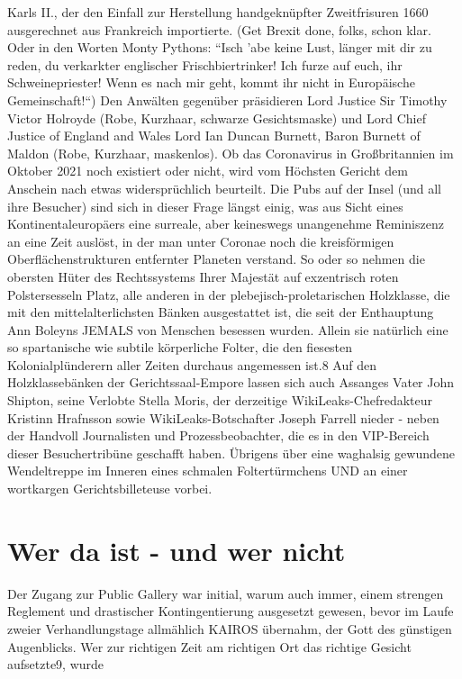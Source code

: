 \begin{multicols}{2}
Karls II., der den Einfall zur Herstellung handgeknüpfter Zweitfrisuren 1660 ausgerechnet aus Frankreich importierte. (Get Brexit done, folks, schon klar. Oder in den
Worten Monty Pythons: “Isch ’abe keine Lust, länger mit
dir zu reden, du verkarkter englischer Frischbiertrinker!
Ich furze auf euch, ihr Schweinepriester! Wenn es nach
mir geht, kommt ihr nicht in Europäische Gemeinschaft!“)
Den Anwälten gegenüber präsidieren Lord Justice Sir
Timothy Victor Holroyde (Robe, Kurzhaar, schwarze
Gesichtsmaske) und Lord Chief Justice of England and
Wales Lord Ian Duncan Burnett, Baron Burnett of Maldon (Robe, Kurzhaar, maskenlos). Ob das Coronavirus
in Großbritannien im Oktober 2021 noch existiert oder
nicht, wird vom Höchsten Gericht dem Anschein nach
etwas widersprüchlich beurteilt. Die Pubs auf der Insel
(und all ihre Besucher) sind sich in dieser Frage längst
einig, was aus Sicht eines Kontinentaleuropäers eine
surreale, aber keineswegs unangenehme Reminiszenz
an eine Zeit auslöst, in der man unter Coronae noch die
kreisförmigen Oberflächenstrukturen entfernter Planeten verstand.
So oder so nehmen die obersten Hüter des Rechtssystems Ihrer Majestät auf exzentrisch roten Polstersesseln Platz, alle anderen in der plebejisch-proletarischen
Holzklasse, die mit den mittelalterlichsten Bänken ausgestattet ist, die seit der Enthauptung Ann Boleyns JEMALS von Menschen besessen wurden. Allein sie natürlich eine so spartanische wie subtile körperliche Folter,
die den fiesesten Kolonialplünderern aller Zeiten durchaus angemessen ist.8
Auf den Holzklassebänken der Gerichtssaal-Empore
lassen sich auch Assanges Vater John Shipton, seine Verlobte Stella Moris, der derzeitige WikiLeaks-Chefredakteur Kristinn Hrafnsson sowie WikiLeaks-Botschafter
Joseph Farrell nieder - neben der Handvoll Journalisten
und Prozessbeobachter, die es in den VIP-Bereich dieser
Besuchertribüne geschafft haben. Übrigens über eine
waghalsig gewundene Wendeltreppe im Inneren eines
schmalen Foltertürmchens UND an einer wortkargen
Gerichtsbilleteuse vorbei.



\chapter{Wer da ist - und wer nicht} %

Der Zugang zur Public Gallery war initial, warum auch
immer, einem strengen Reglement und drastischer Kontingentierung ausgesetzt gewesen, bevor im Laufe zweier Verhandlungstage allmählich KAIROS übernahm, der
Gott des günstigen Augenblicks. Wer zur richtigen Zeit
am richtigen Ort das richtige Gesicht aufsetzte9, wurde


\end{multicols}
